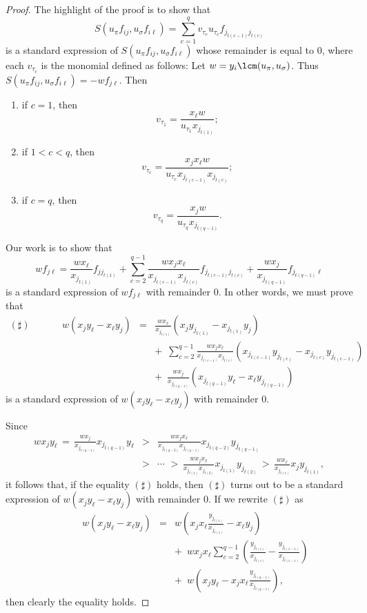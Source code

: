 \documentclass[11pt]{amsart}
\begin{document}
\begin{proof}
The highlight of the proof is to show that
\[
S(u_\pi f_{ij}, u_\sigma f_{i\ell})
= \sum_{c=1}^{q} v_{\tau_c} u_{\tau_c}f_{j_{t(c-1)} j_{t(c)}}
\]
is a standard expression of $S(u_\pi f_{ij}, u_\sigma f_{i\ell})$
whose remainder is equal to $0$,
where each $v_{\tau_c}$ is the monomial defined as follows:
Let $w = y_i \lcm(u_\pi,u_\sigma)$.  Thus $S(u_\pi f_{ij}, u_\sigma f_{i\ell}) = - w f_{j\ell}$.  Then
\begin{enumerate}
\item[(i)] if $c = 1$, then
\[
v_{\tau_1}=\frac{x_{\ell}w}{u_{\tau_1}x_{j_{t(1)}}};
\]
\item[(ii)] if $1 < c < q$, then
\[
v_{\tau_c}=\frac{x_{j}x_{\ell}w}{u_{\tau_c} x_{j_{t(c-1)}}x_{j_{t(c)}}};
\]
\item[(iii)] if $c = q$, then
\[
v_{\tau_q}=\frac{x_{j}w}{u_{\tau_q}x_{j_{t(q-1)}}}.
\]
\end{enumerate}
Our work is to show that
\[
w f_{j\ell}
= \frac{w x_{\ell}}{x_{j_{t(1)}}} f_{j j_{t(1)}} +
\sum_{c=2}^{q-1} \frac{w x_{j}x_{\ell}}{x_{j_{t(c-1)}}x_{j_{t(c)}}}
f_{j_{t(c-1)} j_{t(c)}}
+\frac{w x_{j}}{x_{j_{t(q-1)}}} f_{j_{t(q-1)} \ell}
\]
is a standard expression of $w f_{j\ell}$ with remainder $0$.
In other words, we must prove that
\begin{eqnarray*}
(\sharp)
\, \, \, \, \, \, \, \, \, \,
\, \, \, \, \, \, \, \, \, \,
w (x_jy_\ell - x_\ell y_j)
& = &\frac{w x_{\ell}}{x_{j_{t(1)}}} (x_{j}y_{j_{t(1)}} - x_{j_{t(1)}}y_{j}) \\
&   & + \,\,\, \sum_{c=2}^{q-1} \frac{w x_{j}x_{\ell}}{x_{j_{t(c-1)}}x_{j_{t(c)}}}
(x_{j_{t(c-1)}}y_{j_{t(c)}} - x_{j_{t(c)}}y_{j_{t(c-1)}}) \\
&   & + \,\,\, \frac{w x_{j}}{x_{j_{t(q-1)}}} (x_{j_{t(q-1)}}y_{\ell} - x_{\ell}y_{j_{t(q-1)}})
\end{eqnarray*}
is a standard expression of $w (x_jy_\ell - x_\ell y_j)$ with remainder $0$.

Since
\begin{eqnarray*}
w x_jy_\ell \, = \, \frac{w x_{j}}{x_{j_{t(q-1)}}}x_{j_{t(q-1)}}y_{\ell}
& > & \frac{w x_{j}x_{\ell}}{x_{j_{t(q-2)}}x_{j_{t(q-1)}}}
x_{j_{t(q-2)}}y_{j_{t(q-1)}} \\
& > & \cdots \,
\, > \, \frac{w x_{j}x_{\ell}}{x_{j_{t(1)}}x_{j_{t(2)}}} x_{j_{t(1)}}y_{j_{t(2)}}
\, > \, \frac{w x_{\ell}}{x_{j_{t(1)}}} x_{j}y_{j_{t(1)}},
\end{eqnarray*}
it follows that, if the equality $(\sharp)$ holds, then
$(\sharp)$ turns out to be
a standard expression of $w (x_j y_\ell - x_\ell y_j)$ with remainder $0$.
If we rewrite $(\sharp)$ as
\begin{eqnarray*}
\, \, \, \, \, \, \, \, \, \,
\, \, \, \, \, \, \, \, \, \,
w (x_jy_\ell - x_\ell y_j)
& = & w ( x_j x_\ell \frac{y_{j_{t(1)}}}{x_{j_{t(1)}}} - x_\ell y_j )
\\
&   & + \,\,\, w x_j x_\ell \sum_{c=2}^{q-1}
(
\frac{y_{j_{t(c)}}}{x_{j_{t(c)}}}
-
\frac{y_{j_{t(c-1)}}}{x_{j_{t(c-1)}}}
) \\
&   & + \,\,\,
w (
x_j y_\ell -
x_j x_\ell \frac{y_{j_{t(q-1)}}}
{x_{j_{t(q-1)}}}
) ,
\end{eqnarray*}
then clearly the equality holds.


\end{proof}
\end{document}
